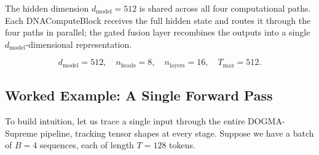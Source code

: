 The hidden dimension $d_{\text{model}} = 512$ is shared across all four computational paths. Each DNAComputeBlock receives the full hidden state and routes it through the four paths in parallel; the gated fusion layer recombines the outputs into a single $d_{\text{model}}$-dimensional representation.

\begin{equation}
d_{\text{model}} = 512, \quad n_{\text{heads}} = 8, \quad n_{\text{layers}} = 16, \quad T_{\max} = 512.
\label{eq:hyperparams}
\end{equation}

\subsection{Worked Example: A Single Forward Pass}
\label{sec:forward-pass-example}

To build intuition, let us trace a single input through the entire DOGMA-Supreme pipeline, tracking tensor shapes at every stage. Suppose we have a batch of $B = 4$ sequences, each of length $T = 128$ tokens.

